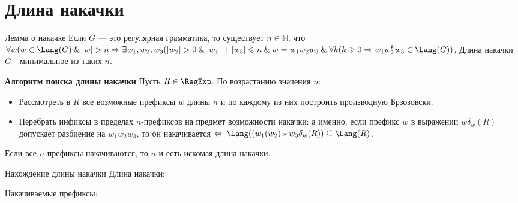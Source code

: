 \section{Длина накачки}
\begin{frame}{Лемма о накачке}
    \vspace{-5pt}
    Если $G$ — это регулярная грамматика, то существует $n \in \mathbb{N}$, что $\forall w(w \in \Lang(G) \:  \& \: |w| > n \Rightarrow \exists w_1, w_2, w_3(|w_2| > 0 \: \&  \: |w_1| + |w_3| \leqslant n \: \& \: w = w_1w_2w_3 \: \& \: \forall k(k\geqslant0 \Rightarrow w_1w_2^kw_3 \in \Lang(G))$. Длина накачки $G$ - минимальное из таких $n$.
    \begin{block}{\bf Алгоритм поиска длины накачки}
    Пусть $R\in\RegExp$. По возрастанию значения $n$:
    \begin{itemize}
        \item Рассмотреть в $R$ все возможные префиксы $w$ длины $n$ и по каждому из них построить производную Брзозовски.
        \item Перебрать инфиксы в пределах $n$-префиксов на предмет возможности накачки: а именно, если префикс $w$ в выражении $w\delta_w(R)$ допускает разбиение на $w_1w_2w_3$, то он накачивается $\Leftrightarrow \: \Lang((w_1(w_2) \star w_3\delta_w(R)) \subseteq \Lang(R)$.
    \end{itemize}
    Если все $n$-префиксы накачиваются, то $n$ и есть искомая длина накачки.
    \end{block}
\end{frame} %
\begin{frame}{Нахождение длины накачки}
    \vspace{-5pt}
	Длина накачки:

    Накачиваемые префиксы:
    
\end{frame}
